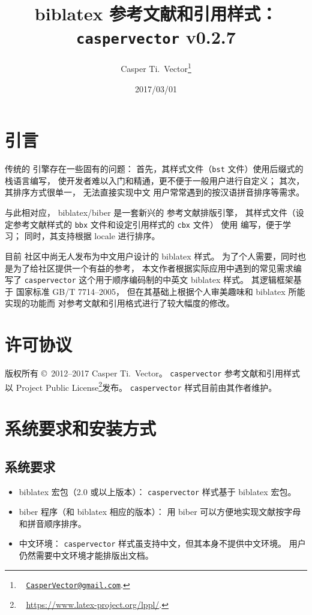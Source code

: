\documentclass[UTF8]{ctexart}
\begin{document}
\title{\textbf{biblatex 参考文献和引用样式：\texttt{caspervector} v0.2.7}}
\author{%
	Casper Ti.\ Vector\thanks{\ %
		\href{mailto:CasperVector@gmail.com}{\texttt{CasperVector@gmail.com}}.%
	}%
}
\date{2017/03/01}
\maketitle

\section{引言}

传统的  引擎存在一些固有的问题：
首先，其样式文件（\verb|bst| 文件）使用后缀式的栈语言编写，
使开发者难以入门和精通，更不便于一般用户进行自定义；
其次，其排序方式很单一，
无法直接实现中文  用户常常遇到的按汉语拼音排序等需求。

与此相对应，
biblatex\supercite{biblatex}/biber\supercite{biber}
是一套新兴的  参考文献排版引擎，
其样式文件（设定参考文献样式的 \verb|bbx| 文件和设定引用样式的 \verb|cbx| 文件）
使用  编写，便于学习；
同时，其支持根据 locale 进行排序。

目前  社区中尚无人发布为中文用户设计的 biblatex 样式。
为了个人需要，同时也是为了给社区提供一个有益的参考，
本文作者根据实际应用中遇到的常见需求编写了
\verb|caspervector| 这个用于顺序编码制的中英文 biblatex 样式。
其逻辑框架基于
国家标准 GB/T 7714--2005\supercite{gbt7714-2005}，
但在其基础上根据个人审美趣味和 biblatex 所能实现的功能而
对参考文献和引用格式进行了较大幅度的修改。

\section{许可协议}

版权所有 \copyright\ 2012--2017 Casper Ti.\ Vector。%
\verb|caspervector| 参考文献和引用样式以
 Project Public License\footnote{\ %
	\url{https://www.latex-project.org/lppl/}.%
}发布。%
\verb|caspervector| 样式目前由其作者维护。

\section{系统要求和安装方式}
\subsection{系统要求}

\begin{itemize}
	\item biblatex 宏包（2.0 或以上版本）：%
		\verb|caspervector| 样式基于 biblatex 宏包。
	\item biber 程序（和 biblatex 相应的版本）：
		用 biber 可以方便地实现文献按字母和拼音顺序排序。
	\item 中文环境：%
		\verb|caspervector| 样式虽支持中文，但其本身不提供中文环境。
		用户仍然需要中文环境才能排版出文档。
\end{itemize}
\end{document}
